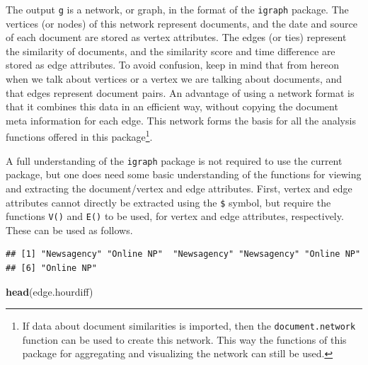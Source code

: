 \documentclass[]{article}
\newenvironment{Shaded}{\begin{snugshade}}{\end{snugshade}}
\newcommand{\KeywordTok}[1]{\textcolor[rgb]{0.13,0.29,0.53}{\textbf{{#1}}}}
\newcommand{\StringTok}[1]{\textcolor[rgb]{0.31,0.60,0.02}{{#1}}}
\newcommand{\NormalTok}[1]{{#1}}
\let\rmarkdownfootnote\footnote%
\def\footnote{\protect\rmarkdownfootnote}
\begin{document}
The output \texttt{g} is a network, or graph, in the format of the
\texttt{igraph} package. The vertices (or nodes) of this network
represent documents, and the date and source of each document are stored
as vertex attributes. The edges (or ties) represent the similarity of
documents, and the similarity score and time difference are stored as
edge attributes. To avoid confusion, keep in mind that from hereon when
we talk about vertices or a vertex we are talking about documents, and
that edges represent document pairs. An advantage of using a network
format is that it combines this data in an efficient way, without
copying the document meta information for each edge. This network forms
the basis for all the analysis functions offered in this
package\footnote{If data about document similarities is imported, then
  the \texttt{document.network} function can be used to create this
  network. This way the functions of this package for aggregating and
  visualizing the network can still be used.}.

A full understanding of the \texttt{igraph} package is not required to
use the current package, but one does need some basic understanding of
the functions for viewing and extracting the document/vertex and edge
attributes. First, vertex and edge attributes cannot directly be
extracted using the \texttt{\$} symbol, but require the functions
\texttt{V()} and \texttt{E()} to be used, for vertex and edge
attributes, respectively. These can be used as follows.

\begin{Shaded}
\end{Shaded}

\begin{verbatim}
## [1] "Newsagency" "Online NP"  "Newsagency" "Newsagency" "Online NP" 
## [6] "Online NP"
\end{verbatim}

\begin{Shaded}
\begin{Highlighting}[]
\KeywordTok{head}\NormalTok{(edge.hourdiff)}
\end{Highlighting}
\end{Shaded}
\end{document}
